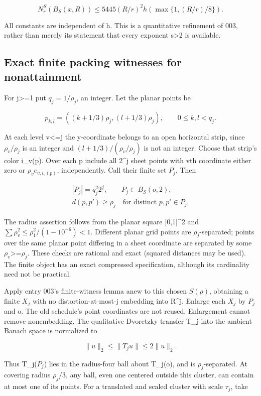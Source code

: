 \documentclass[
  11pt,
]{article}
\theoremstyle{remark}\newtheorem{remark}[theorem]{Remark}
\begin{document}
\[
N_r^S(B_S(x,R))\le5445(R/r)^2h(\max\{1,(R/r)/8\}).\tag{2}
\]

All constants are independent of h. This is a quantitative refinement of
003, rather than merely its statement that every exponent s\textgreater2
is available.

\subsection{Exact finite packing witnesses for
nonattainment}\label{exact-finite-packing-witnesses-for-nonattainment}

For j\textgreater=1 put \(q_j=1/\rho_j\), an integer. Let the planar
points be

\[
p_{k,l}=((k+1/3)\rho_j,(l+1/3)\rho_j),\qquad0\le k,l<q_j.
\]

At each level v\textless=j the y-coordinate belongs to an open
horizontal strip, since \(\rho_v/\rho_j\) is an integer and
\((l+1/3)/(\rho_v/\rho_j)\) is not an integer. Choose that strip's color
i\_v(p). Over each p include all 2\^{}j sheet points with vth coordinate
either zero or \(\rho_v e_{v,i_v(p)}\), independently. Call their finite
set \(P_j\). Then

\[
\begin{gathered}|P_j|=q_j^2 2^j,\qquad P_j\subset B_S(o,2),\\ d(p,p')\ge\rho_j\quad\text{for distinct }p,p'\in P_j.\end{gathered}\tag{3}
\]

The radius assertion follows from the planar square {[}0,1{]}\^{}2 and
\(\sum\rho_v^2\le\rho_1^2/(1-10^{-6})<1\). Different planar grid points
are \(\rho_j\)-separated; points over the same planar point differing in
a sheet coordinate are separated by some
\(\rho_v\)\textgreater=\(\rho_j\). These checks are rational and exact
(squared distances may be used). The finite object has an exact
compressed specification, although its cardinality need not be
practical.

Apply entry 003's finite-witness lemma anew to this chosen \(S(\rho)\),
obtaining a finite \(X_j\) with no distortion-at-most-j embedding into
R\^{}j. Enlarge each \(X_j\) by \(P_j\) and o. The old schedule's point
coordinates are not reused. Enlargement cannot remove nonembedding. The
qualitative Dvoretzky transfer T\_j into the ambient Banach space is
normalized to

\[
\|u\|_2\le\|T_ju\|\le2\|u\|_2.
\]

Thus T\_j(\(P_j\)) lies in the radius-four ball about T\_j(o), and is
\(\rho_j\)-separated. At covering radius \(\rho_j\)/3, any ball, even
one centered outside this cluster, can contain at most one of its
points. For a translated and scaled cluster with scale \(\tau_j\), take
\end{document}
